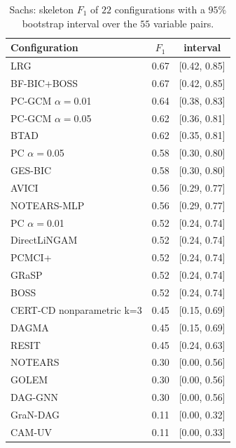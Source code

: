 \begin{table}[ht]
\caption{Sachs: skeleton $F_1$ of $22$ configurations with a $95\%$ bootstrap interval over the $55$ variable pairs.}
\label{tab:sachs_ci}
\small
\begin{tabular}{@{}lcc@{}}
\toprule
Configuration & $F_1$ & interval\\
\midrule
LRG & 0.67 & [0.42, 0.85]\\
BF-BIC+BOSS & 0.67 & [0.42, 0.85]\\
PC-GCM $\alpha=$0.01 & 0.64 & [0.38, 0.83]\\
PC-GCM $\alpha=$0.05 & 0.62 & [0.36, 0.81]\\
BTAD & 0.62 & [0.35, 0.81]\\
PC $\alpha=$0.05 & 0.58 & [0.30, 0.80]\\
GES-BIC & 0.58 & [0.30, 0.80]\\
AVICI & 0.56 & [0.29, 0.77]\\
NOTEARS-MLP & 0.56 & [0.29, 0.77]\\
PC $\alpha=$0.01 & 0.52 & [0.24, 0.74]\\
DirectLiNGAM & 0.52 & [0.24, 0.74]\\
PCMCI+ & 0.52 & [0.24, 0.74]\\
GRaSP & 0.52 & [0.24, 0.74]\\
BOSS & 0.52 & [0.24, 0.74]\\
CERT-CD nonparametric k=3 & 0.45 & [0.15, 0.69]\\
DAGMA & 0.45 & [0.15, 0.69]\\
RESIT & 0.45 & [0.24, 0.63]\\
NOTEARS & 0.30 & [0.00, 0.56]\\
GOLEM & 0.30 & [0.00, 0.56]\\
DAG-GNN & 0.30 & [0.00, 0.56]\\
GraN-DAG & 0.11 & [0.00, 0.32]\\
CAM-UV & 0.11 & [0.00, 0.33]\\
\bottomrule
\end{tabular}
\end{table}

